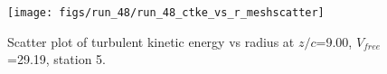 \begin{figure}[H]
\centering
\texttt{[image: figs/run\_48/run\_48\_ctke\_vs\_r\_meshscatter]}
\caption{Scatter plot of turbulent kinetic energy vs radius at $z/c$=9.00, $V_{free}$=29.19, station 5.}
\end{figure}


